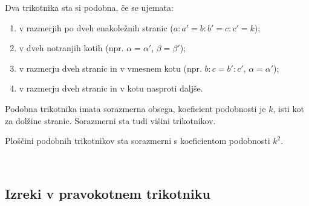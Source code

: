         

        
        
            \begin{izrek}
                Dva trikotnika sta si podobna, če se ujemata:
                \begin{enumerate}
                    \item v razmerjih po dveh enakoležnih stranic ($a:a'=b:b'=c:c'=k$);
                    \item v dveh notranjih kotih (npr. $\alpha=\alpha'$, $\beta=\beta'$);
                    \item v razmerju dveh stranic in v vmesnem kotu (npr. $b:c=b':c'$, $\alpha=\alpha'$);
                    \item v razmerju dveh stranic in v kotu nasproti daljše.
                \end{enumerate}
            \end{izrek}

            \begin{izrek}
                Podobna trikotnika imata sorazmerna obsega, koeficient podobnosti je $k$, isti kot za dolžine stranic.
                Sorazmerni sta tudi višini trikotnikov.

                Ploščini podobnih trikotnikov sta sorazmerni s koeficientom podobnosti $k^2$.
            \end{izrek}
        

            ~\\
        
        
            \subsection*{Izreki v pravokotnem trikotniku}


